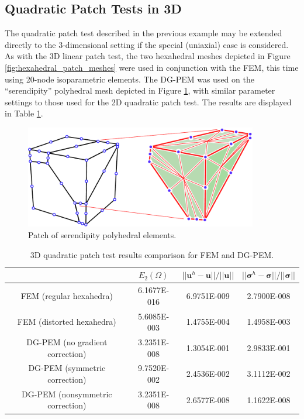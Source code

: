 \subsection*{Quadratic Patch Tests in 3D}

The quadratic patch test described in the previous example may be extended directly to the 3-dimensional setting if the special (uniaxial) case is considered. As with the 3D linear patch test, the two hexahedral meshes depicted in Figure \ref{fig:hexahedral_patch_meshes} were used in conjunction with the FEM, this time using 20-node isoparametric elements. The DG-PEM was used on the ``serendipity'' polyhedral mesh depicted in Figure \ref{fig:quadratic_polyhedral_patch_mesh}, with similar parameter settings to those used for the 2D quadratic patch test. The results are displayed in Table \ref{tab:quadratic_patch_test_3d}.

\begin{figure}[!h]
    \centering
    \includegraphics[width=4.0in]{figures/quadratic_polyhedral_patch_mesh.pdf}
    	\caption{Patch of serendipity polyhedral elements.}
    \label{fig:quadratic_polyhedral_patch_mesh}
\end{figure}

\begin{table}[!ht]
  \begin{center}
    \begin{tabular}{| c || c | c | c |}
    \hline
           & $E_2 (\Omega)$ & $||\mathbf{u}^h - \mathbf{u}|| / ||\mathbf{u}||$ & $||\boldsymbol{\sigma}^h - \boldsymbol{\sigma}|| / ||\boldsymbol{\sigma}||$ \\ \hline \hline
    FEM (regular hexahedra) & 6.1677E-016 & 6.9751E-009 & 2.7900E-008 \\ \hline
    FEM (distorted hexahedra) & 5.6085E-003 & 1.4755E-004 & 1.4958E-003 \\ \hline
    DG-PEM (no gradient correction) & 3.2351E-008 & 1.3054E-001 & 2.9833E-001 \\ \hline
    DG-PEM (symmetric correction) & 9.7520E-002 & 2.4536E-002 & 3.1112E-002 \\ \hline
    DG-PEM (nonsymmetric correction) & 3.2351E-008 & 2.6577E-008 & 1.1622E-008 \\
    \hline
    \end{tabular}
    \caption{3D quadratic patch test results comparison for FEM and DG-PEM.}
    \vspace{-5pt}
    \label{tab:quadratic_patch_test_3d}
    \vspace{-10pt}
  \end{center}
\end{table}

